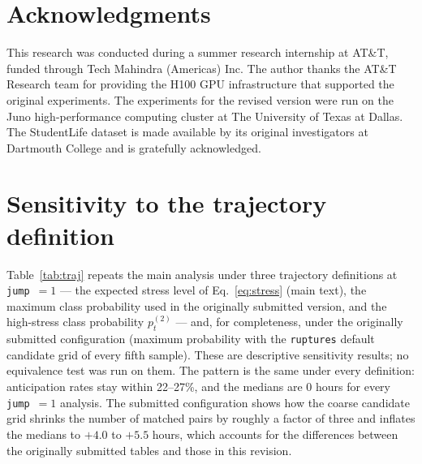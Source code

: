 \documentclass[preprint,12pt,authoryear]{elsarticle}
\begin{document}
\section*{Acknowledgments}

This research was conducted during a summer research internship at
AT\&T, funded through Tech Mahindra (Americas) Inc. The author thanks
the AT\&T Research team for providing the H100 GPU infrastructure that
supported the original experiments. The experiments for the revised
version were run on the Juno high-performance computing cluster at The
University of Texas at Dallas. The StudentLife dataset is made
available by its original investigators at Dartmouth College and is
gratefully acknowledged.

\appendix
\section{Sensitivity to the trajectory definition}
\label{app:maxprob}

Table~\ref{tab:traj} repeats the main analysis under three trajectory
definitions at \texttt{jump}~$=1$ --- the expected stress level of
Eq.~\ref{eq:stress} (main text), the maximum class probability used in
the originally submitted version, and the high-stress class probability
$p_t^{(2)}$ --- and, for completeness, under the originally submitted
configuration (maximum probability with the \texttt{ruptures} default
candidate grid of every fifth sample). These are descriptive sensitivity results; no equivalence test was
run on them. The pattern is the same under every definition: anticipation rates stay within
22--27\%, and the medians are 0 hours for every \texttt{jump}~$=1$
analysis. The submitted configuration shows how the coarse candidate
grid shrinks the number of matched pairs by roughly a factor of three
and inflates the medians to $+4.0$ to $+5.5$ hours, which accounts for
the differences between the originally submitted tables and those in
this revision.
\end{document}

